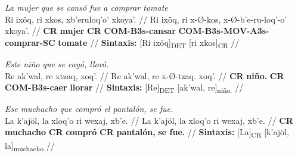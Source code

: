 \documentclass{article}%
\begin{document}
%
\par\medskip%
\ex
\textit{La mujer que se cansó fue a comprar tomate} \\
\begingl
\gla Ri ixöq, ri xkos, xb'eruloq'o' xkoya'. //
\glb Ri ixöq, ri x-Ø-kos, x-Ø-b'e-ru-loq'-o' xkoya'. //
\glc \textbf{CR} \textbf{mujer} \textbf{CR} \textbf{COM-}\textbf{B3s-}\textbf{cansar} \textbf{COM-}\textbf{B3s-}\textbf{MOV-}\textbf{A3s-}\textbf{comprar-}\textbf{SC} \textbf{tomate} //
\glft \textbf{Sintaxis:} [Ri ixöq]\textsubscript{DET} [ri xkos]\textsubscript{CR} //
\endgl
\xe
%
\medskip%
\par\medskip%
\ex
\textit{Este niño que se cayó, lloró.} \\
\begingl
\gla Re ak'wal, re xtzaq, xoq'. //
\glb Re ak'wal, re x-Ø-tzaq. xoq'. //
\glc \textbf{CR} \textbf{niño.} \textbf{CR} \textbf{COM-}\textbf{B3s-}\textbf{caer} \textbf{llorar} //
\glft \textbf{Sintaxis:} [Re]\textsubscript{DET} [ak'wal, re]\textsubscript{niño.} //
\endgl
\xe
%
\medskip%
\par\medskip%
\ex
\textit{Ese muchacho que compró el pantalón, se fue.} \\
\begingl
\gla La k'ajöl, la xloq'o ri wexaj, xb'e. //
\glb La k'ajöl, la xloq'o ri wexaj, xb'e. //
\glc \textbf{CR} \textbf{muchacho} \textbf{CR} \textbf{compró} \textbf{CR} \textbf{pantalón,} \textbf{se fue.} //
\glft \textbf{Sintaxis:} [La]\textsubscript{CR} [k'ajöl, la]\textsubscript{muchacho} //
\endgl
\xe
%
\medskip

%
\end{document}
